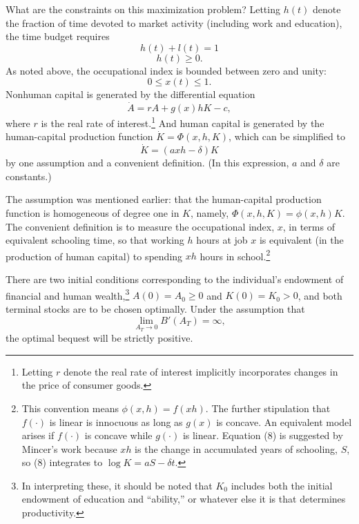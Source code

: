 \documentclass[11pt,fleqn]{article}
\begin{document}
What are the constraints on this maximization problem? Letting $h(t)$ denote the fraction of time devoted to market activity (including work and education), the time budget requires
\begin{equation}
h(t) + l(t) = 1
\end{equation}
\begin{equation}
h(t) \geq 0.
\end{equation}
As noted above, the occupational index is bounded between zero and unity:
\begin{equation}
0 \leq x(t) \leq 1.
\end{equation}
Nonhuman capital is generated by the differential equation
\begin{equation}
\dot{A} = rA + g(x)hK - c,
\end{equation}
where $r$ is the real rate of interest.\footnote{Letting $r$ denote the real rate of interest implicitly incorporates changes in the price of consumer goods.} And human capital is generated by the human-capital production function $\dot{K} = \Phi(x, h, K)$, which can be simplified to
\begin{equation}
\dot{K} = (axh - \delta)K
\end{equation}
by one assumption and a convenient definition. (In this expression, $a$ and $\delta$ are constants.)

The assumption was mentioned earlier: that the human-capital production function is homogeneous of degree one in $K$, namely, $\Phi(x, h, K) = \phi(x, h)K$. The convenient definition is to measure the occupational index, $x$, in terms of equivalent schooling time, so that working $h$ hours at job $x$ is equivalent (in the production of human capital) to spending $xh$ hours in school.\footnote{This convention means $\phi(x, h) = f(xh)$. The further stipulation that $f(\cdot)$ is linear is innocuous as long as $g(x)$ is concave. An equivalent model arises if $f(\cdot)$ is concave while $g(\cdot)$ is linear. Equation (8) is suggested by Mincer's work because $xh$ is the change in accumulated years of schooling, $S$, so (8) integrates to $\log K = aS - \delta t$.}

There are two initial conditions corresponding to the individual's endowment of financial and human wealth,\footnote{In interpreting these, it should be noted that $K_0$ includes both the initial endowment of education and ``ability,'' or whatever else it is that determines productivity.} $A(0) = A_0 \geq 0$ and $K(0) = K_0 > 0$, and both terminal stocks are to be chosen optimally. Under the assumption that
\[
\lim_{A_T \to 0} B'(A_T) = \infty,
\]
the optimal bequest will be strictly positive.
\end{document}
